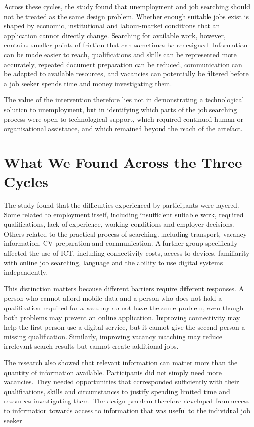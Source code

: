 Across these cycles, the study found that unemployment and job searching should not be treated as the same design problem. Whether enough suitable jobs exist is shaped by economic, institutional and labour-market conditions that an application cannot directly change. Searching for available work, however, contains smaller points of friction that can sometimes be redesigned. Information can be made easier to reach, qualifications and skills can be represented more accurately, repeated document preparation can be reduced, communication can be adapted to available resources, and vacancies can potentially be filtered before a job seeker spends time and money investigating them.

The value of the intervention therefore lies not in demonstrating a technological solution to unemployment, but in identifying which parts of the job searching process were open to technological support, which required continued human or organisational assistance, and which remained beyond the reach of the artefact.


\section{What We Found Across the Three Cycles}

The study found that the difficulties experienced by participants were layered. Some related to employment itself, including insufficient suitable work, required qualifications, lack of experience, working conditions and employer decisions. Others related to the practical process of searching, including transport, vacancy information, CV preparation and communication. A further group specifically affected the use of ICT, including connectivity costs, access to devices, familiarity with online job searching, language and the ability to use digital systems independently.

This distinction matters because different barriers require different responses. A person who cannot afford mobile data and a person who does not hold a qualification required for a vacancy do not have the same problem, even though both problems may prevent an online application. Improving connectivity may help the first person use a digital service, but it cannot give the second person a missing qualification. Similarly, improving vacancy matching may reduce irrelevant search results but cannot create additional jobs.

The research also showed that relevant information can matter more than the quantity of information available. Participants did not simply need more vacancies. They needed opportunities that corresponded sufficiently with their qualifications, skills and circumstances to justify spending limited time and resources investigating them. The design problem therefore developed from access to information towards access to information that was useful to the individual job seeker.

